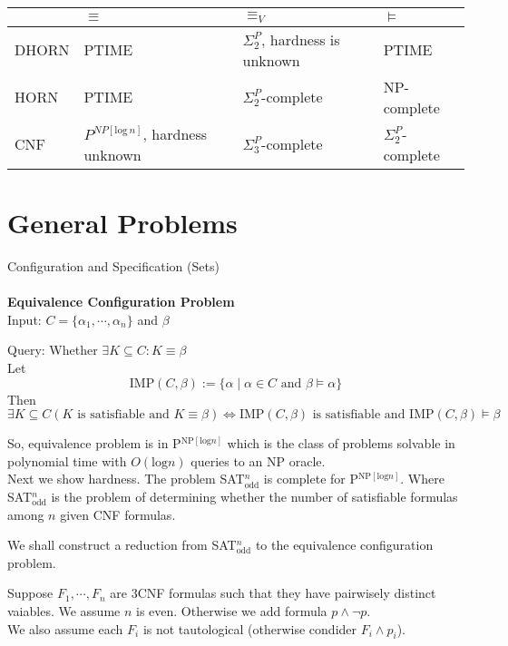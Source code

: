 \documentclass[12pt]{article}
\begin{document}
\begin{tabular}{l|l|l|l}
& $\equiv$ & $\equiv_V$ & $\models$\\ \hline
DHORN & PTIME & $\Sigma_2^P$, hardness is unknown & PTIME \\ \hline
HORN & PTIME & $\Sigma_2^P$-complete & NP-complete\\ \hline
CNF & $P^{NP[\text{log}\, n]}$, hardness unknown& $\Sigma_3^P$-complete & $\Sigma_2^P$-complete
\end{tabular}


\section{General Problems}

Configuration and Specification (Sets)\\ \ \\

{\bf Equivalence Configuration Problem}\\

Input: $C=\{\alpha_1,\cdots,\alpha_n\}$ and $\beta$

Query: Whether $\exists K\subseteq C: K\equiv \beta$\\

Let
$$\mbox{IMP}(C,\beta):=\{\alpha\mid \alpha\in C \mbox{ and }\beta\models \alpha\}$$
Then
$$\exists K\subseteq  C(K \text{ is satisfiable and } K\equiv \beta)\Longleftrightarrow\mbox{IMP}(C,\beta) \text{ is satisfiable and IMP}(C,\beta)\models \beta$$

So, equivalence problem is in P$^{\text{NP}[\text{log} n]}$ which is the class of problems solvable in polynomial time with $O(\text{log}n)$ queries to an NP oracle.\\

Next we show hardness. The problem SAT$^n_{\text{odd}}$ is complete for P$^{\text{NP}[\text{log} n]}$. Where SAT$^n_{\text{odd}}$ is the problem of determining whether the number of satisfiable formulas among $n$ given CNF formulas.

We shall construct a reduction from SAT$^n_{\text{odd}}$ to the equivalence configuration problem. 

Suppose $F_1,\cdots, F_n$ are 3CNF formulas such that they have pairwisely distinct vaiables. We assume $n$ is even. Otherwise we add formula $p\wedge \neg p$. \\

We also assume each $F_i$ is not tautological (otherwise condider $F_i\wedge p_i$).\\ 
\end{document}
